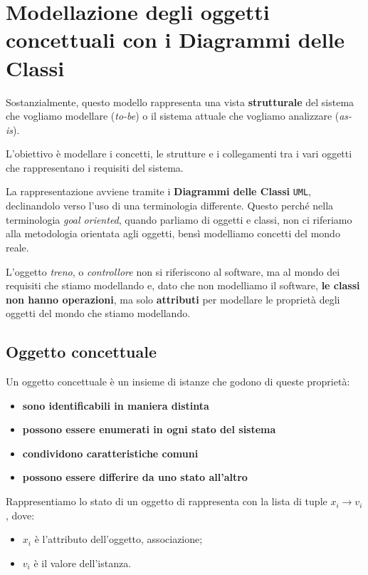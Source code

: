 \chapter{Modellazione degli oggetti concettuali con i Diagrammi delle Classi}
Sostanzialmente, questo modello rappresenta una vista \textbf{strutturale} del sistema che
vogliamo modellare (\textit{to-be}) o il sistema attuale che vogliamo analizzare 
(\textit{as-is}).

L'obiettivo è modellare i concetti, le strutture e i collegamenti tra i vari 
oggetti che rappresentano i requisiti del sistema.

La rappresentazione avviene tramite i \textbf{Diagrammi delle Classi} \texttt{UML}, declinandolo 
verso l'uso di una terminologia differente. Questo perché nella terminologia 
\textit{goal oriented}, quando parliamo di oggetti e classi, non ci riferiamo alla 
metodologia orientata agli oggetti, bensì modelliamo concetti del mondo reale.

L'oggetto \textit{treno}, o \textit{controllore} non si riferiscono al software, ma al mondo dei 
requisiti che stiamo modellando e, dato che non modelliamo il
software, \textbf{le classi non hanno operazioni}, ma solo \textbf{attributi} per modellare 
le proprietà degli oggetti del mondo che stiamo modellando.

\section{Oggetto concettuale}
\begin{tcolorbox}[colback=violet!5!white,colframe=violet!75!black, title=Oggetto concettuale]
    Un oggetto concettuale è un insieme di istanze che godono di queste proprietà:
    \begin{itemize}
        \item \textbf{sono identificabili in maniera distinta}
        \item \textbf{possono essere enumerati in ogni stato del sistema}
        \item \textbf{condividono caratteristiche comuni}
        \item \textbf{possono essere differire da uno stato all'altro}
    \end{itemize}
\end{tcolorbox}
Rappresentiamo lo stato di un oggetto di rappresenta con la lista di tuple $x_i \rightarrow v_i$,
dove:
\begin{itemize}
    \item $x_i$ è l'attributo dell'oggetto, associazione;
    \item $v_i$ è il valore dell'istanza.
\end{itemize}
